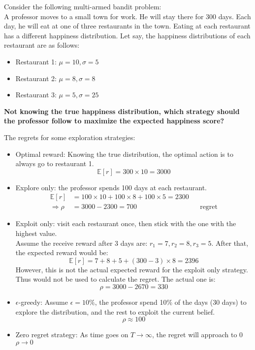  Consider the following multi-armed bandit problem:\\
A professor moves to a small town for work. He will stay there for 300 days. Each day, he will eat at one of three restaurants in the town. Eating at each restaurant has a different happiness distribution. Let say, the happiness distributions of each restaurant are as follows:
\begin{itemize}
	\item Restaurant 1: $\mu=10, \sigma=5$
	\item Restaurant 2: $\mu=8, \sigma=8$
	\item Restaurant 3: $\mu=5, \sigma=25$
\end{itemize}
\textbf{Not knowing the true happiness distribution, which strategy should the professor follow to maximize the expected happiness score?}

The regrets for some exploration strategies:
\begin{itemize}
	\item Optimal reward: Knowing the true distribution, the optimal action is to always go to restaurant 1.
	\[ \mathbb{E}[r] = 300 \times 10 = 3000\]
	\item Explore only: the professor spends 100 days at each restaurant.
	\begin{align*}
		\mathbb{E}[r] &= 100 \times 10 + 100 \times 8 + 100 \times 5 = 2300\\
		\Rightarrow \rho &= 3000 - 2300 = 700 && \text{regret}
	\end{align*}
	\item Exploit only: visit each restaurant once, then stick with the one with the highest value.\\
	Assume the receive reward after 3 days are: $r_1 = 7, r_2 = 8, r_3 = 5$. After that, the expected reward would be:
	\[ \mathbb{E}[r] = 7 + 8 + 5 + (300 - 3) \times 8 = 2396 \]
	However, this is not the actual expected reward for the exploit only strategy. Thus would not be used to calculate the regret. The actual one is:
	\[\rho = 3000 - 2670 = 330\]
	\item $\epsilon$-greedy: Assume $\epsilon = 10\%$, the professor spend 10\% of the days (30 days) to explore the distribution, and the rest to exploit the current belief.
	\[\rho \approx 100\]
	\item Zero regret strategy: As time goes on $T\rightarrow \infty$, the regret will approach to 0 $\rho \rightarrow0$
\end{itemize}

